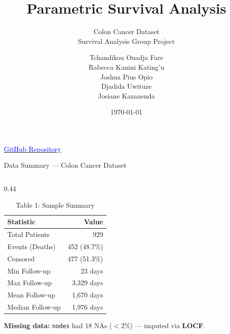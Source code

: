 \documentclass[aspectratio=169, 11pt]{beamer}
\title{\textbf{Parametric Survival Analysis}}
\subtitle{Colon Cancer Dataset\\[2pt]\small{Survival Analysis Group Project}}
\author[Group 2]{%
	\small
	\begin{tabular}{l}
		Tchandikou Ouadja Fare  \\[2pt]
		Rabecca Kanini Kating'u \\[2pt]
		Joshua Pius Opio        \\[2pt]
		Djadida Uwituze         \\[2pt]
		Josiane Kazanenda       \\
	\end{tabular}
}
\date{\today}
\institute{AIMS Rwanda}
\begin{document}
	
	\begin{frame}
		\titlepage
		\vspace{-8pt}
		\begin{center}
			\small
			\href{https://github.com/tchfare/Survival-Analysis-Group2}{\textcolor{blue}{GitHub Repository}}
		\end{center}
	\end{frame}

\begin{frame}{Data Summary --- Colon Cancer Dataset}
\begin{columns}[T]

  \begin{column}{0.44\textwidth}
    \vspace{2pt}
    \begin{table}
      \caption{Table 1: Sample Summary}
      \small
      \begin{tabular}{@{}lr@{}}
        \toprule
        \textbf{Statistic}  & \textbf{Value} \\
        \midrule
        Total Patients      & 929            \\
        Events (Deaths)     & 452 (48.7\%)   \\
        Censored            & 477 (51.3\%)   \\
        Min Follow-up       & 23 days        \\
        Max Follow-up       & 3{,}329 days   \\
        Mean Follow-up      & 1{,}670 days   \\
        Median Follow-up    & 1{,}976 days   \\
        \bottomrule
      \end{tabular}
    \end{table}
    \vspace{3pt}
    \footnotesize
    \textbf{Missing data:} \texttt{nodes} had 18 NAs
    ($<$2\%) --- imputed via \textbf{LOCF}.
  \end{column}


\end{columns}
\end{frame}
\end{document}

